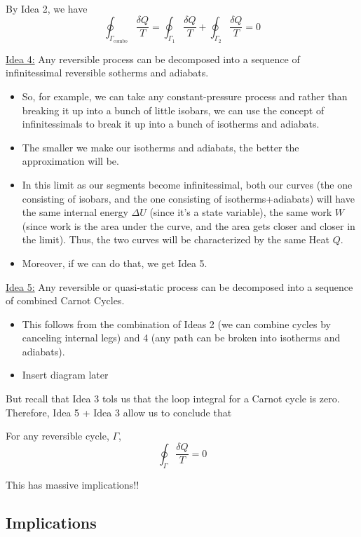 \documentclass{article}
\begin{document}
By Idea 2, we have 
\[ \oint_{{\Gamma_{\text{combo}}}} \frac{\delta Q}{T} = \oint_{{\Gamma_{1}}} \frac{\delta Q}{T}  + \oint_{{\Gamma_{2}}} \frac{\delta Q}{T} = 0 \]


\vskip 0.5cm
\underline{Idea 4:} Any reversible process can be decomposed into a sequence of infinitessimal reversible sotherms and adiabats.

\begin{itemize}
  \item So, for example, we can take any constant-pressure process and rather than breaking it up into a bunch of little isobars, we can use the concept of infinitessimals to break it up into a bunch of isotherms and adiabats.
  \item The smaller we make our isotherms and adiabats, the better the approximation will be.
  \item In this limit as our segments become infinitessimal, both our curves (the one consisting of isobars, and the one consisting of isotherms+adiabats) will have the same internal energy $\Delta U$ (since it's a state variable), the same work $W$ (since work is the area under the curve, and the area gets closer and closer in the limit). Thus, the two curves will be characterized by the same Heat $Q$.
  \item Moreover, if we can do that, we get Idea 5.
\end{itemize}

\vskip 0.5cm
\underline{Idea 5:} Any reversible or quasi-static process can be decomposed into a sequence of combined Carnot Cycles.

\begin{itemize}
  \item This follows from the combination of Ideas 2 (we can combine cycles by canceling internal legs) and 4 (any path can be broken into isotherms and adiabats).
  \item Insert diagram later
\end{itemize}


But recall that Idea 3 tols us that the loop integral for a Carnot cycle is zero. Therefore, Idea 5 + Idea 3 allow us to conclude that 

\begin{dottedbox}
  For any reversible cycle, $\Gamma$, 
  \[ \boxed{\oint_{\Gamma} \frac{\delta Q}{T} = 0} \]
\end{dottedbox}

This has massive implications!!

\vskip 1cm
\subsection{Implications}
\end{document}
